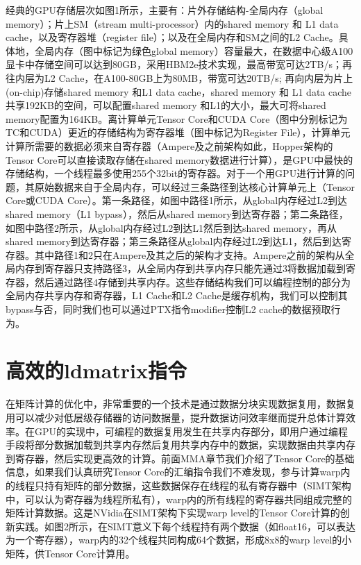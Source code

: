 经典的GPU存储层次如图1所示，主要有：片外存储结构-全局内存（global memory）；片上SM（stream multi-processor）内的shared  memory 和 L1 data cache，以及寄存器堆（register file）；以及在全局内存和SM之间的L2 Cache。具体地，全局内存（图中标记为绿色global memory）容量最大，在数据中心级A100显卡中存储空间可以达到80GB，采用HBM2e技术实现，最高带宽可达2TB/s；再往内层为L2 Cache，在A100-80GB上为80MB，带宽可达20TB/s; 再向内层为片上(on-chip)存储shared memory 和L1 data cache，shared memory 和 L1 data cache 共享192KB的空间，可以配置shared memory 和L1的大小，最大可将shared memory配置为164KB。离计算单元Tensor Core和CUDA Core（图中分别标记为TC和CUDA）更近的存储结构为寄存器堆（图中标记为Register File），计算单元计算所需要的数据必须来自寄存器（Ampere及之前架构如此，Hopper架构的Tensor Core可以直接读取存储在shared memory数据进行计算），是GPU中最快的存储结构，一个线程最多使用255个32bit的寄存器。对于一个用GPU进行计算的问题，其原始数据来自于全局内存，可以经过三条路径到达核心计算单元上（Tensor Core或CUDA Core）。第一条路径，如图中路径1所示，从global内存经过L2到达shared memory（L1 bypass），然后从shared memory到达寄存器；第二条路径，如图中路径2所示，从global内存经过L2到达L1然后到达shared memory，再从shared memory到达寄存器；第三条路径从global内存经过L2到达L1，然后到达寄存器。其中路径1和2只在Ampere及其之后的架构才支持。Ampere之前的架构从全局内存到寄存器只支持路径3，从全局内存到共享内存只能先通过3将数据加载到寄存器，然后通过路径4存储到共享内存。这些存储结构我们可以编程控制的部分为全局内存共享内存和寄存器，L1 Cache和L2 Cache是缓存机构，我们可以控制其bypass与否，同时我们也可以通过PTX指令modifier控制L2 cache的数据预取行为。

\section{高效的ldmatrix指令}

在矩阵计算的优化中，非常重要的一个技术是通过数据分块实现数据复用，数据复用可以减少对低层级存储器的访问数据量，提升数据访问效率继而提升总体计算效率。在GPU的实现中，可编程的数据复用发生在共享内存部分，即用户通过编程手段将部分数据加载到共享内存然后复用共享内存中的数据，实现数据由共享内存到寄存器，然后实现更高效的计算。前面MMA章节我们介绍了Tensor Core的基础信息，如果我们认真研究Tensor Core的汇编指令我们不难发现，参与计算warp内的线程只持有矩阵的部分数据，这些数据保存在线程的私有寄存器中（SIMT架构中，可以认为寄存器为线程所私有），warp内的所有线程的寄存器共同组成完整的矩阵计算数据。这是NVidia在SIMT架构下实现warp level的Tensor Core计算的创新实践。如图2所示，在SIMT意义下每个线程持有两个数据（如float16，可以表达为一个寄存器），warp内的32个线程共同构成64个数据，形成8x8的warp level的小矩阵，供Tensor Core计算用。

